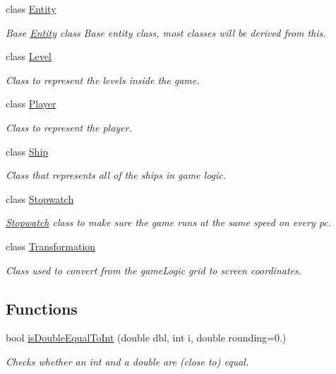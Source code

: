\begin{DoxyCompactItemize}
class \hyperlink{classGameLogic_1_1Entity}{Entity}
\begin{DoxyCompactList}\small\item\em Base \hyperlink{classGameLogic_1_1Entity}{Entity} class Base entity class, most classes will be derived from this. \end{DoxyCompactList}\item 
class \hyperlink{classGameLogic_1_1Level}{Level}
\begin{DoxyCompactList}\small\item\em Class to represent the levels inside the game. \end{DoxyCompactList}\item 
class \hyperlink{classGameLogic_1_1Player}{Player}
\begin{DoxyCompactList}\small\item\em Class to represent the player. \end{DoxyCompactList}\item 
class \hyperlink{classGameLogic_1_1Ship}{Ship}
\begin{DoxyCompactList}\small\item\em Class that represents all of the ships in game logic. \end{DoxyCompactList}\item 
class \hyperlink{classGameLogic_1_1Stopwatch}{Stopwatch}
\begin{DoxyCompactList}\small\item\em \hyperlink{classGameLogic_1_1Stopwatch}{Stopwatch} class to make sure the game runs at the same speed on every pc. \end{DoxyCompactList}\item 
class \hyperlink{classGameLogic_1_1Transformation}{Transformation}
\begin{DoxyCompactList}\small\item\em Class used to convert from the game\+Logic grid to screen coordinates. \end{DoxyCompactList}\end{DoxyCompactItemize}
\subsection*{Functions}
\begin{DoxyCompactItemize}
\item 
bool \hyperlink{namespaceGameLogic_a788b107597480e46241295de1c44670a}{is\+Double\+Equal\+To\+Int} (double dbl, int i, double rounding=0.)
\begin{DoxyCompactList}\small\item\em Checks whether an int and a double are (close to) equal. \end{DoxyCompactList}\end{DoxyCompactItemize}



